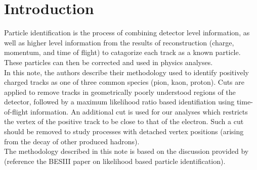 \section{Introduction}


Particle identification is the process of combining detector level information, as well as higher level information from the results of reconstruction (charge, momentum, and time of flight) to catagorize each track as a known particle.  These particles can then be corrected and used in physics analyses. \\

In this note, the authors describe their methodology used to identify positively charged tracks as one of three common species (pion, kaon, proton).  Cuts are applied to remove tracks in geometrically poorly understood regions of the detector, followed by a maximum likelihood ratio based identifiation using time-of-flight information.  An additional cut is used for our analyses which restricts the vertex of the positive track to be close to that of the electron.  Such a cut should be removed to study processes with detached vertex positions (arising from the decay of other produced hadrons). \\

The methodology described in this note is based on the discussion provided by (reference the BESIII paper on likelihood based particle identification).  


